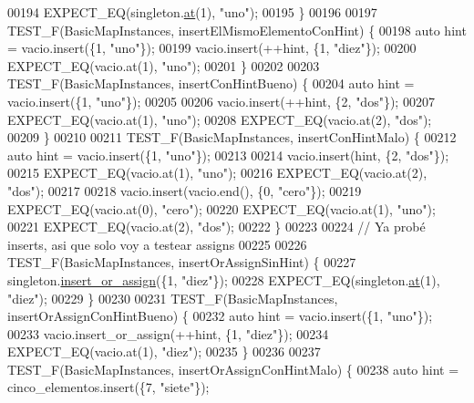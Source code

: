 \begin{DoxyCode}
00194     EXPECT\_EQ(singleton.\hyperlink{classaed2_1_1map_a0b0a11f906da2926f9eb342fcee79fd7_a0b0a11f906da2926f9eb342fcee79fd7}{at}(1), \textcolor{stringliteral}{"uno"});
00195 \}
00196 
00197 TEST\_F(BasicMapInstances, insertElMismoElementoConHint) \{
00198     \textcolor{keyword}{auto} hint = vacio.insert(\{1, \textcolor{stringliteral}{"uno"}\});
00199     vacio.insert(++hint, \{1, \textcolor{stringliteral}{"diez"}\});
00200     EXPECT\_EQ(vacio.at(1), \textcolor{stringliteral}{"uno"});
00201 \}
00202 
00203 TEST\_F(BasicMapInstances, insertConHintBueno) \{
00204     \textcolor{keyword}{auto} hint = vacio.insert(\{1, \textcolor{stringliteral}{"uno"}\});
00205 
00206     vacio.insert(++hint, \{2, \textcolor{stringliteral}{"dos"}\});
00207     EXPECT\_EQ(vacio.at(1), \textcolor{stringliteral}{"uno"});
00208     EXPECT\_EQ(vacio.at(2), \textcolor{stringliteral}{"dos"});
00209 \}
00210 
00211 TEST\_F(BasicMapInstances, insertConHintMalo) \{
00212     \textcolor{keyword}{auto} hint = vacio.insert(\{1, \textcolor{stringliteral}{"uno"}\});
00213 
00214     vacio.insert(hint, \{2, \textcolor{stringliteral}{"dos"}\});
00215     EXPECT\_EQ(vacio.at(1), \textcolor{stringliteral}{"uno"});
00216     EXPECT\_EQ(vacio.at(2), \textcolor{stringliteral}{"dos"});
00217 
00218     vacio.insert(vacio.end(), \{0, \textcolor{stringliteral}{"cero"}\});
00219     EXPECT\_EQ(vacio.at(0), \textcolor{stringliteral}{"cero"});
00220     EXPECT\_EQ(vacio.at(1), \textcolor{stringliteral}{"uno"});
00221     EXPECT\_EQ(vacio.at(2), \textcolor{stringliteral}{"dos"});
00222 \}
00223 
00224 \textcolor{comment}{// Ya probé inserts, asi que solo voy a testear assigns}
00225 
00226 TEST\_F(BasicMapInstances, insertOrAssignSinHint) \{
00227     singleton.\hyperlink{classaed2_1_1map_a2ef6723c183916276b0afc4a4c721475_a2ef6723c183916276b0afc4a4c721475}{insert\_or\_assign}(\{1, \textcolor{stringliteral}{"diez"}\});
00228     EXPECT\_EQ(singleton.\hyperlink{classaed2_1_1map_a0b0a11f906da2926f9eb342fcee79fd7_a0b0a11f906da2926f9eb342fcee79fd7}{at}(1), \textcolor{stringliteral}{"diez"});
00229 \}
00230 
00231 TEST\_F(BasicMapInstances, insertOrAssignConHintBueno) \{
00232     \textcolor{keyword}{auto} hint = vacio.insert(\{1, \textcolor{stringliteral}{"uno"}\});
00233     vacio.insert\_or\_assign(++hint, \{1, \textcolor{stringliteral}{"diez"}\});
00234     EXPECT\_EQ(vacio.at(1), \textcolor{stringliteral}{"diez"});
00235 \}
00236 
00237 TEST\_F(BasicMapInstances, insertOrAssignConHintMalo) \{
00238     \textcolor{keyword}{auto} hint = cinco\_elementos.insert(\{7, \textcolor{stringliteral}{"siete"}\});

\end{DoxyCode}
